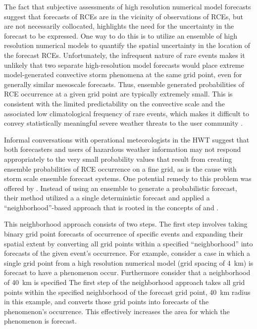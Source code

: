 The fact that subjective assessments of high resolution numerical model forecasts suggest that forecasts of RCEs are in the vicinity of observations of RCEs, but are not necessarily collocated, highlights the need for the uncertainty in the forecast to be expressed.
One way to do this is to utilize an ensemble of high resolution numerical models to quantify the spatial uncertainty in the location of the forecast RCEs.
Unfortunately, the infrequent nature of rare events makes it unlikely that two separate high-resolution model forecasts would place extreme model-generated convective storm phenomena at the same grid point, even for generally similar mesoscale forecasts.
Thus, ensemble generated probabilities of RCE occurrence at a given grid point are typically extremely small.
This is consistent with the limited predictability on the convective scale and the associated low climatological frequency of rare events, which makes it difficult to convey statistically meaningful severe weather threats to the user community \citep{Murphy1991}.


Informal conversations with operational meteorologists in the HWT suggest that both forecasters and users of hazardous weather information may not respond appropriately to the very small probability values that result from creating ensemble probabilities of RCE occurrence on a fine grid, as is the cause with storm scale ensemble forecast systems.
One potential remedy to this problem was offered by \cite{Sobash2011}.
Instead of using an ensemble to generate a probabilistic forecast, their method utilized a a single deterministic forecast and applied a ``neighborhood''-based approach that is rooted in the concepts of \cite{Theis2005} and \cite{Brooks1998}.


This neighborhood approach consists of two steps.
The first step involves taking binary grid point forecasts of occurrence of specific events and expanding their spatial extent by converting all grid points within a specified ``neighborhood'' into forecasts of the given event's occurrence.
For example, consider a case in which a single grid point from a high resolution numerical model (grid spacing of \mbox{4 km}) is forecast to have a phenomenon occur.
Furthermore consider that a neighborhood of \mbox{40 km} is specified
The first step of the neighborhood approach takes all grid points within the specified neighborhood of the forecast grid point, \mbox{40 km} radius in this example, and converts those grid points into forecasts of the phenomenon's occurrence.
This effectively increases the area for which the phenomenon is forecast.


